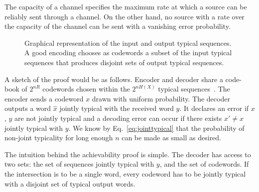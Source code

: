 
The capacity of a channel specifies the maximum rate at which a source can be reliably sent through a channel. On the other hand, no source with a rate over the capacity of the channel can be sent with a vanishing error probability.

\begin{figure}
\begin{center}
\def\svgwidth{\columnwidth} 
 
\caption[Jointly typical sequences]{Graphical representation of the input and output typical sequences. A good encoding chooses as codewords a subset of the input typical sequences that produces disjoint sets of output typical sequences.}
\label{fig:channel}
\end{center}
\end{figure}

A sketch of the proof would be as follows. Encoder and decoder share a code-book of $2^{nR}$ codewords chosen within the $2^{nH(X)}$ typical sequences~\cite{Massey_77}. The encoder sends a codeword ${x}$ drawn with uniform probability. The decoder outputs a word $\hat{{x}}$ jointly typical with the received word ${y}$. It declares an error if ${x}$, ${y}$ are not jointly typical and a decoding error can occur if there exists ${x}'\neq {x}$ jointly typical with ${y}$. We know by Eq.~\ref{eq:jointtypical} that the probability of non-joint typicality for long enough $n$ can be made as small as desired. %


The intuition behind the achievability proof is simple. The decoder has access to two sets: the set of sequences jointly typical with ${y}$, and the set of codewords. If the intersection is to be a single word, every codeword has to be jointly typical with a disjoint set of typical output words. 

